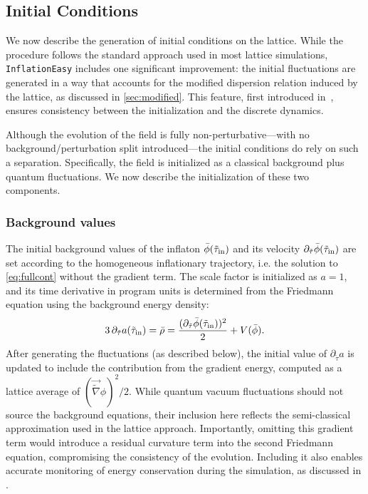 \documentclass[aps, nofootinbib,superscriptaddress, preprintnumbers, longbibliography]{article}
\begin{document}
	
\subsection{Initial Conditions}
\label{sec:ic}

We now describe the generation of initial conditions on the lattice. While the procedure follows the standard approach used in most lattice simulations, \texttt{InflationEasy} includes one significant improvement: the initial fluctuations are generated in a way that accounts for the modified dispersion relation induced by the lattice, as discussed in \cref{sec:modified}. This feature, first introduced in~\cite{Caravano:2021pgc}, ensures consistency between the initialization and the discrete dynamics.

Although the evolution of the field is fully non-perturbative—with no background/perturbation split introduced—the initial conditions do rely on such a separation. Specifically, the field is initialized as a classical background plus quantum fluctuations. We now describe the initialization of these two components.

\subsubsection{Background values}

The initial background values of the inflaton $\bar{\phi}(\tilde\tau_{\rm in})$ and its velocity $\partial_{\tilde\tau} \bar{\phi}(\tilde\tau_{\rm in})$ are set according to the homogeneous inflationary trajectory, i.e. the solution to \eqref{eq:fullcont} without the gradient term. The scale factor is initialized as $a = 1$, and its time derivative in program units is determined from the Friedmann equation using the background energy density:
\begin{equation}
\label{eq:initial_H}
3\,\partial_{\tilde\tau} a(\tilde\tau_{\rm in}) = \bar\rho = \frac{(\partial_{\tilde\tau} \bar\phi(\tilde\tau_{\rm in}))^2}{2} + V(\bar\phi).
\end{equation}
After generating the fluctuations (as described below), the initial value of $\partial_{\tilde\tau} a$ is updated to include the contribution from the gradient energy, computed as a lattice average of $(\vec{\tilde\nabla} \phi)^2 / 2$. While quantum vacuum fluctuations should not source the background equations, their inclusion here reflects the semi-classical approximation used in the lattice approach. Importantly, omitting this gradient term would introduce a residual curvature term into the second Friedmann equation, compromising the consistency of the evolution. Including it also enables accurate monitoring of energy conservation during the simulation, as discussed in \cite{latticeeasy,Caravano:2022yyv}.
\end{document}
